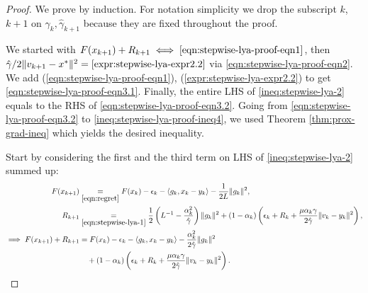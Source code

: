 \documentclass[12pt]{article}
\begin{document}
    \begin{proof}
        We prove by induction. 
        For notation simplicity we drop the subscript $k$, $k + 1$ on $\gamma_{k}, \hat \gamma_{k + 1}$ because they are fixed throughout the proof. 
        \par 
        We started with $F(x_{k + 1}) + R_{k + 1} \iff \eqref{eqn:stepwise-lya-proof-eqn1}$, 
        then $\hat \gamma/2\Vert v_{k + 1} - x^*\Vert^2 = \eqref{expr:stepwise-lya-expr2.2}$ via \eqref{eqn:stepwise-lya-proof-eqn2}. 
        We add (\ref{eqn:stepwise-lya-proof-eqn1}), (\ref{expr:stepwise-lya-expr2.2}) to get \eqref{eqn:stepwise-lya-proof-eqn3.1}. 
        Finally, the entire LHS of \eqref{ineq:stepwise-lya-2} equals to the RHS of \eqref{eqn:stepwise-lya-proof-eqn3.2}. 
        Going from \eqref{eqn:stepwise-lya-proof-eqn3.2} to \eqref{ineq:stepwise-lya-proof-ineq4}, we used Theorem \ref{thm:prox-grad-ineq} which yields the desired inequality. 
        \par
        Start by considering the first and the third term on LHS of \eqref{ineq:stepwise-lya-2} summed up: 
        \begin{align}\label{eqn:stepwise-lya-proof-eqn1}
            F(x_{k + 1}) &\underset{\eqref{eqn:regret}}{=}
            F(x_k) - \epsilon_k - \langle  g_k, x_k - y_k\rangle - \frac{1}{2L}\Vert g_k\Vert^2,
            \notag
            \\
            R_{k + 1}
            &\underset{\eqref{eqn:stepwise-lya-1}}{=} 
            \frac{1}{2}\left(
                L^{-1} - \frac{\alpha_k^2}{\hat \gamma}
            \right)\Vert g_k\Vert^2
            + 
            (1 - \alpha_k)
            \left(
                \epsilon_k + R_k + 
                \frac{\mu\alpha_k\gamma}{2\hat \gamma}
                \Vert v_k - y_k\Vert^2
            \right), 
            \notag
            \\
            \implies 
            F(x_{k + 1}) + R_{k + 1}
            &= 
            F(x_k) - \epsilon_k - \langle  g_k, x_k - y_k\rangle
            - \frac{\alpha_k^2}{2\hat \gamma}\Vert g_k\Vert^2
            \notag
            \\
            &\quad 
                + 
                (1 - \alpha_k)
                \left(
                    \epsilon_k + R_k + 
                    \frac{\mu\alpha_k\gamma}{2\hat \gamma}
                    \Vert v_k - y_k\Vert^2
                \right). 
        \end{align}

\end{proof}
\end{document}
